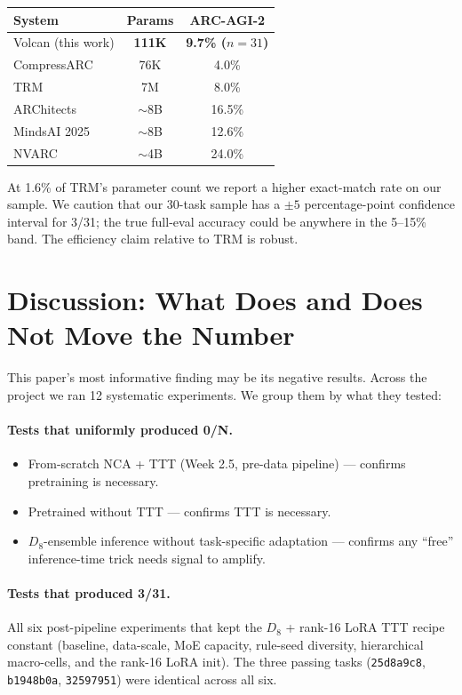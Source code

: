 \documentclass[11pt]{article}
\begin{document}
\begin{center}
\begin{tabular}{lcc}
\toprule
System & Params & ARC-AGI-2 \\
\midrule
Volcan (this work) & \textbf{111K} & \textbf{9.7\% ($n=31$)} \\
CompressARC \citep{liao2025compressarc} & 76K & 4.0\% \\
TRM \citep{jolicoeur2025trm} & 7M & 8.0\% \\
ARChitects \citep{architects2025} & $\sim$8B & 16.5\% \\
MindsAI 2025 & $\sim$8B & 12.6\% \\
NVARC \citep{sorokin2025nvarc} & $\sim$4B & 24.0\% \\
\bottomrule
\end{tabular}
\end{center}

At 1.6\% of TRM's parameter count we report a higher exact-match rate on our sample. We caution that our 30-task sample has a $\pm 5$ percentage-point confidence interval for 3/31; the true full-eval accuracy could be anywhere in the 5--15\% band. The efficiency claim relative to TRM is robust.

\section{Discussion: What Does and Does Not Move the Number}
\label{sec:discussion}

This paper's most informative finding may be its negative results. Across the project we ran 12 systematic experiments. We group them by what they tested:

\paragraph{Tests that uniformly produced 0/N.}
\begin{itemize}
    \item From-scratch NCA + TTT (Week 2.5, pre-data pipeline) --- confirms pretraining is necessary.
    \item Pretrained without TTT --- confirms TTT is necessary.
    \item $D_8$-ensemble inference without task-specific adaptation --- confirms any ``free'' inference-time trick needs signal to amplify.
\end{itemize}

\paragraph{Tests that produced 3/31.}
All six post-pipeline experiments that kept the $D_8$ + rank-16 LoRA TTT recipe constant (baseline, data-scale, MoE capacity, rule-seed diversity, hierarchical macro-cells, and the rank-16 LoRA init). The three passing tasks (\texttt{25d8a9c8}, \texttt{b1948b0a}, \texttt{32597951}) were identical across all six.
\end{document}
